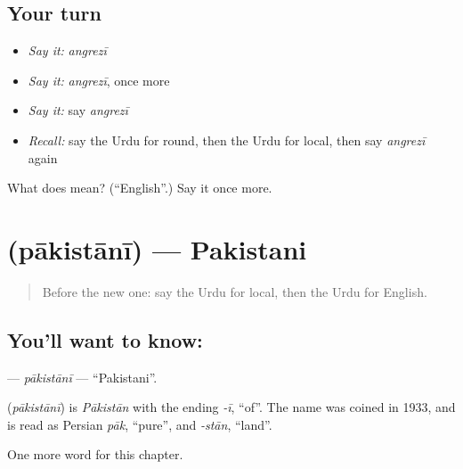 \subsection*{Your turn}
\begin{itemize}
\raggedright
  \item \emph{Say it:} \emph{angrezī}
  \item \emph{Say it:} \emph{angrezī}, once more
  \item \emph{Say it:} say \emph{angrezī}
  \item \emph{Recall:} say the Urdu for round, then the Urdu for local, then say \emph{angrezī} again
\end{itemize}

\begin{tcolorbox}[breakable,colback=teal!4,colframe=teal!35!black,title={Before you move on}]
What does  mean? (\textquotedblleft{}English\textquotedblright{}.) Say it once more.
\end{tcolorbox}
\section[\texorpdfstring{\ur{پاکستانی} (pākistānī)}{پاکستانی (pākistānī)}]{ (pākistānī) — Pakistani}

\label{lesson:UR-C162-pakistani}



\begin{quote}
Before the new one: say the Urdu for local, then the Urdu for English.
\end{quote}

\subsection*{You'll want to know: }
\textbf{} — \emph{pākistānī} — \textquotedblleft{}Pakistani\textquotedblright{}.

\begin{cousinweb}
\textbf{} (\emph{pākistānī}) is \emph{Pākistān} with the ending \emph{-ī}, \textquotedblleft{}of\textquotedblright{}. The name was coined in 1933, and is read as Persian \emph{pāk}, \textquotedblleft{}pure\textquotedblright{}, and \emph{-stān}, \textquotedblleft{}land\textquotedblright{}.
\end{cousinweb}

\begin{grammarlens}[title={What you've built}]
One more word for this chapter.
\end{grammarlens}

